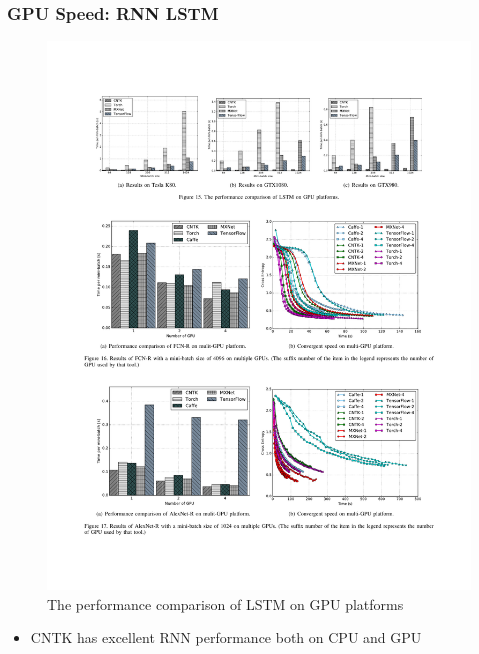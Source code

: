 \begin{frame}
	\MyLogo
	\frametitle{GPU Speed: RNN LSTM}
	
	\begin{figure}[htbp] 
		\includegraphics[width=\linewidth]{figures/LSTM2.pdf} 
		\caption{The performance comparison of LSTM on GPU platforms}
	\end{figure}

\pause

\vskip -10pt
\begin{mdframed}[style=mystyle1]
\begin{itemize}
\item CNTK has excellent RNN performance both on CPU and GPU
\end{itemize}
\end{mdframed}
	
\end{frame}


